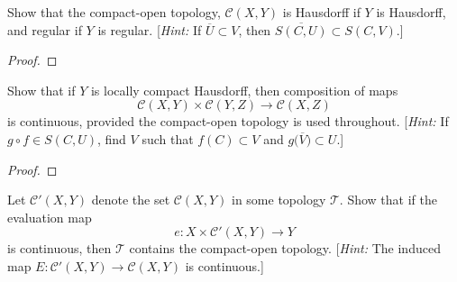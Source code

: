 \begin{problem}[Munkres \S 46, Ex.\,6]
Show that the compact-open topology, $\mathcal{C}(X,Y)$ is
Hausdorff if $Y$ is Hausdorff, and regular if $Y$ is
regular. [\emph{Hint:} If $\overline U\subset V$, then
$\overline{S(C,U)}\subset S(C,V)$.]
\end{problem}
\begin{proof}

\end{proof}
\newpage
\begin{problem}[Munkres \S 46, Ex.\,7]
Show that if $Y$ is locally compact Hausdorff, then composition
of maps
\[\mathcal{C}(X,Y)\times\mathcal{C}(Y,Z)\longrightarrow\mathcal{C}(X,Z)\]
is continuous, provided the compact-open topology is used
throughout. [\emph{Hint:} If $g\circ f\in S(C,U)$, find $V$ such
that $f(C)\subset V$ and $g\bigl(\overline{V}\bigr)\subset U$.]
\end{problem}
\begin{proof}
\end{proof}
\newpage
\begin{problem}[Munkres \S 46, Ex.\,8]
Let $\mathcal{C}'(X,Y)$ denote the set $\mathcal{C}(X,Y)$ in some
topology $\mathcal{T}$. Show that if the evaluation map
\[
e\colon X\times\mathcal{C}'(X,Y)\longrightarrow Y
\]
is continuous, then $\mathcal{T}$ contains the compact-open
topology. [\emph{Hint:} The induced map
$E\colon\mathcal{C}'(X,Y)\to\mathcal{C}(X,Y)$ is continuous.]
\end{problem}
